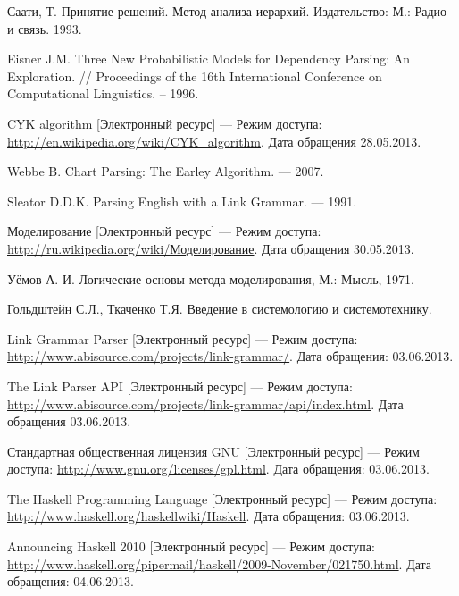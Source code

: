 \begin{thebibliography}{99}
	Саати, Т. Принятие решений. Метод анализа иерархий. Издательство: М.: Радио и связь. 1993.	

	Eisner J.M. Three New Probabilistic Models for Dependency Parsing: An Exploration. // Proceedings of the 16th International Conference on Computational Linguistics. – 1996.

	CYK algorithm [Электронный ресурс] --- Режим доступа: \url{http://en.wikipedia.org/wiki/CYK_algorithm}. Дата обращения 28.05.2013.	

	Webbe B. Chart Parsing: The Earley Algorithm. --- 2007.

	Sleator D.D.K. Parsing English with a Link Grammar. --- 1991.

	Моделирование [Электронный ресурс] --- Режим доступа: \url{http://ru.wikipedia.org/wiki/Моделирование}. Дата обращения 30.05.2013.

	Уёмов А. И. Логические основы метода моделирования, М.: Мысль, 1971.

	Гольдштейн С.Л., Ткаченко Т.Я. Введение в системологию и системотехнику.

	Link Grammar Parser [Электронный ресурс] --- Режим доступа: \url{http://www.abisource.com/projects/link-grammar/}. Дата обращения: 03.06.2013.	

	The Link Parser API [Электронный ресурс] --- Режим доступа: \url{http://www.abisource.com/projects/link-grammar/api/index.html}. Дата обращения 03.06.2013.	

	Стандартная общественная лицензия GNU [Электронный ресурс] --- Режим доступа: \url{http://www.gnu.org/licenses/gpl.html}. Дата обращения: 03.06.2013.

	The Haskell Programming Language [Электронный ресурс] --- Режим доступа: \url{http://www.haskell.org/haskellwiki/Haskell}. Дата обращения: 03.06.2013.

	Announcing Haskell 2010 [Электронный ресурс] --- Режим доступа: \url{http://www.haskell.org/pipermail/haskell/2009-November/021750.html}. Дата обращения: 04.06.2013.
\end{thebibliography}